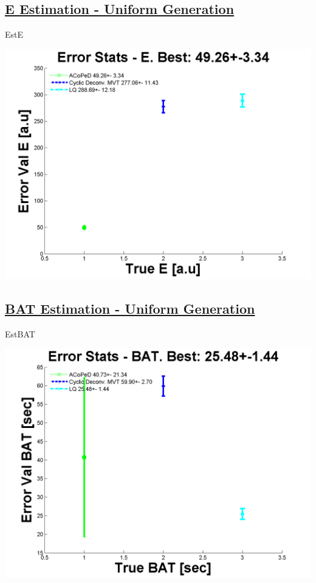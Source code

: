 \documentclass[english]{article}
\begin{document}
\subsection*{\underline{E Estimation - Uniform Generation}}

EstE




\includegraphics[scale=0.7]{Est_E_Uniform.png}

\subsection*{\underline{BAT Estimation - Uniform Generation}}

EstBAT




\includegraphics[scale=0.7]{Est_BAT_Uniform.png}
\end{document}
